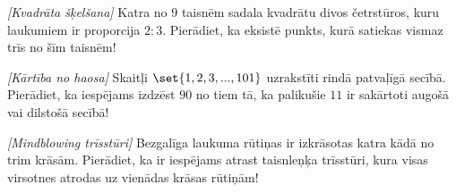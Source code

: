 \begin{problem}
\textit{[Kvadrāta šķelšana]}
Katra no $9$ taisnēm sadala kvadrātu divos četrstūros, kuru laukumiem ir proporcija $2:3$. Pierādiet, ka eksistē punkts, kurā satiekas vismaz trīs no šīm taisnēm!
\end{problem}
%

\begin{problem}
\textit{[Kārtība no haosa]}
Skaitļi $\set{1,2,3,...,101}$ uzrakstīti rindā patvaļīgā secībā. Pierādiet, ka iespējams izdzēst $90$ no tiem tā, ka palikušie $11$ ir sakārtoti  augošā vai dilstošā secībā!
\end{problem}
%

\begin{problem}
\textit{[Mindblowing trīsstūri]}
Bezgalīga laukuma rūtiņas ir izkrāsotas katra kādā no trim krāsām. Pierādiet, ka ir iespējams atrast taisnleņķa trīsstūri, kura visas virsotnes atrodas uz vienādas krāsas rūtiņām!
\end{problem}
%


